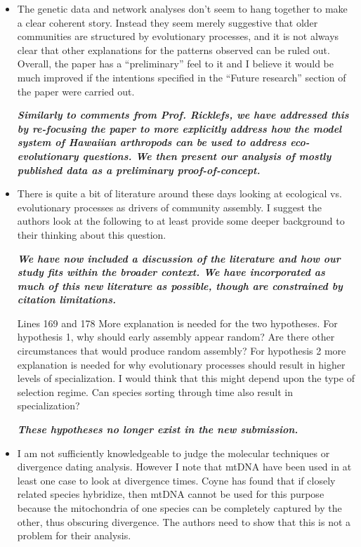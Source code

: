 \documentclass[12pt]{article}
\begin{document}
\begin{itemize}
\item The genetic data and network analyses don't seem to hang
  together to make a clear coherent story. Instead they seem merely
  suggestive that older communities are structured by evolutionary
  processes, and it is not always clear that other explanations for
  the patterns observed can be ruled out. Overall, the paper has a
  ``preliminary'' feel to it and I believe it would be much improved
  if the intentions specified in the ``Future research'' section of
  the paper were carried out.

  \textit{\textbf{Similarly to comments from Prof. Ricklefs, we have
      addressed this by re-focusing the paper to more explicitly
      address how the model system of Hawaiian arthropods can be used
      to address eco-evolutionary questions. We then present our
      analysis of mostly published data as a preliminary
      proof-of-concept.}}
%
\item There is quite a bit of literature around these days looking at
  ecological vs. evolutionary processes as drivers of community
  assembly. I suggest the authors look at the following to at least
  provide some deeper background to their thinking about this
  question.

  \textit{\textbf{ We have now included a discussion of the literature
      and how our study fits within the broader context. We have
      incorporated as much of this new literature as possible, though
      are constrained by citation limitations.}}
%
\item[Lines 169 and 178] More explanation is needed for the two
  hypotheses. For hypothesis 1, why should early assembly appear
  random?  Are there other circumstances that would produce random
  assembly? For hypothesis 2 more explanation is needed for why
  evolutionary processes should result in higher levels of
  specialization. I would think that this might depend upon the type
  of selection regime. Can species sorting through time also result in
  specialization?

  \textit{\textbf{These hypotheses no longer exist in the new
      submission.}}
%
\item I am not sufficiently knowledgeable to judge the molecular
  techniques or divergence dating analysis. However I note that mtDNA
  have been used in at least one case to look at divergence
  times. Coyne has found that if closely related species hybridize,
  then mtDNA cannot be used for this purpose because the mitochondria
  of one species can be completely captured by the other, thus
  obscuring divergence. The authors need to show that this is not a
  problem for their analysis.


\end{itemize}
\end{document}
